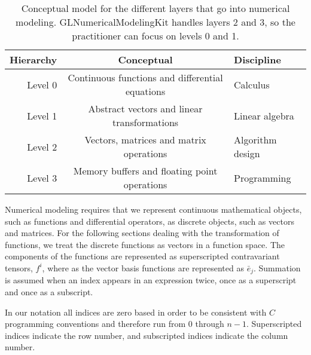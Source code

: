 \documentclass[11pt]{article}
\begin{document}
\begin{table}
  \centering 
\begin{tabular}{|r|c|l|}
      \hline
      Hierarchy & Conceptual & Discipline \tabularnewline \hline \hline
      Level 0 & Continuous functions and differential equations & Calculus \tabularnewline \hline
      Level 1 & Abstract vectors and linear transformations & Linear algebra \tabularnewline \hline
      Level 2 & Vectors, matrices and matrix operations & Algorithm design \tabularnewline \hline
      Level 3 & Memory buffers and floating point operations & Programming \tabularnewline \hline
\end{tabular}
  \caption{Conceptual model for the different layers that go into numerical modeling. GLNumericalModelingKit handles layers 2 and 3, so the practitioner can focus on levels 0 and 1.}\label{conceptual_layers}
\end{table}

Numerical modeling requires that we represent continuous mathematical objects, such as functions and differential operators, as discrete objects, such as vectors and matrices. For the following sections dealing with the transformation of functions, we treat the discrete functions as vectors in a function space. The components of the functions are represented as superscripted contravariant tensors, $f^i$, where as the vector basis functions are represented as $\bar{e}_j$. Summation is assumed when an index appears in an expression twice, once as a superscript and once as a subscript.

In our notation all indices are zero based in order to be consistent with $C$ programming conventions and therefore run from $0$ through $n-1$. Superscripted indices indicate the row number, and subscripted indices indicate the column number.
\end{document}
